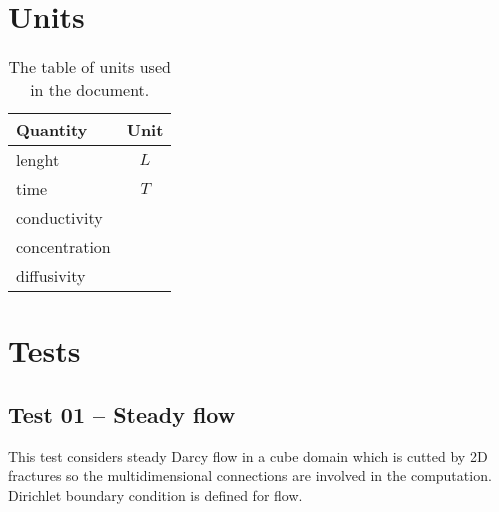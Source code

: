 %
%
%
%

\chapter{Units}
\begin{table}
  \label{tab:units}
  \begin{center}
    \begin{tabular}{|l|c|}
      \hline
      \textbf{Quantity} & \textbf{Unit} \\
      \hline 
      lenght & $L$ \\
      time & $T$ \\
      conductivity & $ $ \\
      concentration & $ $ \\
      diffusivity & $ $ \\
      \hline
    \end{tabular}
  \caption{The table of units used in the document.}
  \end{center}
\end{table}

\chapter{Tests}
\label{sec:tests}



\section{Test 01 -- Steady flow}
\label{sec:test01}
This test considers steady Darcy flow in a cube domain which is cutted by 2D fractures so the multidimensional connections are involved in the computation. Dirichlet boundary condition is defined for flow.

